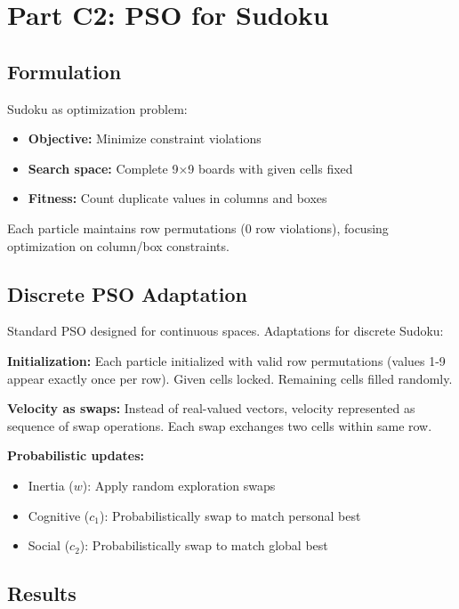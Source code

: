 \documentclass[letterpaper]{article}
\begin{document}
\section{Part C2: PSO for Sudoku}

\subsection{Formulation}

Sudoku as optimization problem:
\begin{itemize}
\item \textbf{Objective:} Minimize constraint violations
\item \textbf{Search space:} Complete 9×9 boards with given cells fixed
\item \textbf{Fitness:} Count duplicate values in columns and boxes
\end{itemize}

Each particle maintains row permutations (0 row violations), focusing optimization on column/box constraints.

\subsection{Discrete PSO Adaptation}

Standard PSO designed for continuous spaces. Adaptations for discrete Sudoku:

\textbf{Initialization:} Each particle initialized with valid row permutations (values 1-9 appear exactly once per row). Given cells locked. Remaining cells filled randomly.

\textbf{Velocity as swaps:} Instead of real-valued vectors, velocity represented as sequence of swap operations. Each swap exchanges two cells within same row.

\textbf{Probabilistic updates:}
\begin{itemize}
\item Inertia ($w$): Apply random exploration swaps
\item Cognitive ($c_1$): Probabilistically swap to match personal best
\item Social ($c_2$): Probabilistically swap to match global best
\end{itemize}

\subsection{Results}
\end{document}
